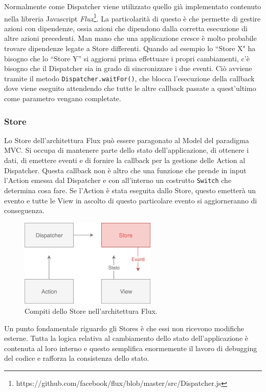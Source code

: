 Normalmente come Dispatcher viene utilizzato quello già implementato contenuto nella libreria Javascript \textit{Flux}\footnote{https://github.com/facebook/flux/blob/master/src/Dispatcher.js}. La particolarità di questo è che permette di gestire azioni con dipendenze, ossia azioni che dipendono dalla corretta esecuzione di altre azioni precedenti. Man mano che una applicazione cresce è molto probabile trovare dipendenze legate a Store differenti. Quando ad esempio lo “Store X" ha bisogno che lo “Store Y” si aggiorni prima effettuare i propri cambiamenti, c'è bisogno che il Dispatcher sia in grado di sincronizzare i due eventi. Ciò avviene tramite il metodo \texttt{Dispatcher.waitFor()}, che blocca l'esecuzione della callback dove viene eseguito attendendo che tutte le altre callback passate a quest'ultimo come parametro vengano completate.

\subsubsection*{Store}
Lo Store dell'architettura Flux può essere paragonato al Model del paradigma MVC. Si occupa di mantenere parte dello stato dell'applicazione, di ottenere i dati, di emettere eventi e di fornire la callback per la gestione delle Action al Dispatcher. Questa callback non è altro che una funzione che prende in input l'Action emessa dal Dispatcher e con all'interno un costrutto \texttt{Switch} che determina cosa fare. Se l'Action è stata eseguita dallo Store, questo emetterà un evento e tutte le View in ascolto di questo particolare evento si aggiorneranno di conseguenza.

\begin{figure}[h]
\centering
\vspace*{0.5cm} 
\includegraphics[width=6.5cm]{./images/StoreWorkflow}
\caption{Compiti dello Store nell'architettura Flux.}
\label{StoreWorkflow}
\vspace*{0.5cm} 
\end{figure}

Un punto fondamentale riguardo gli Stores è che essi non ricevono modifiche esterne. Tutta la logica relativa al cambiamento dello stato dell'applicazione è contenuta al loro interno e questo semplifica enormemente il lavoro di debugging del codice e rafforza la consistenza dello stato.

